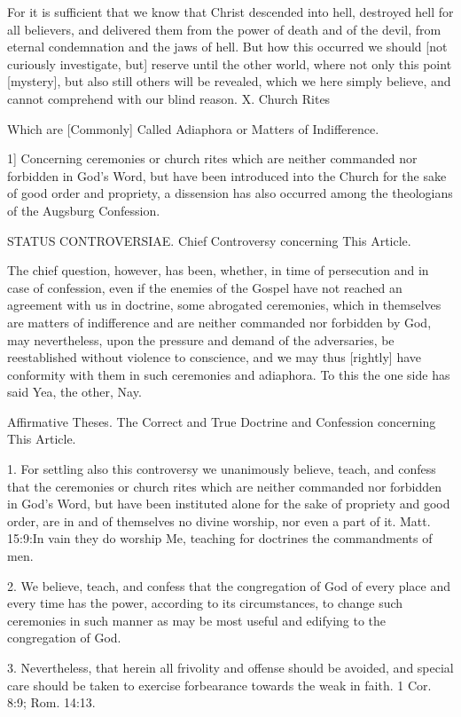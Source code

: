 For it is sufficient that we know that Christ descended into hell, destroyed hell for all believers, and delivered them from the power of death and of the devil, from eternal condemnation and the jaws of hell. But how this occurred we should [not curiously investigate, but] reserve until the other world, where not only this point [mystery], but also still others will be revealed, which we here simply believe, and cannot comprehend with our blind reason.
X. Church Rites

Which are [Commonly] Called Adiaphora or Matters of Indifference.

1] Concerning ceremonies or church rites which are neither commanded nor forbidden in God's Word, but have been introduced into the Church for the sake of good order and propriety, a dissension has also occurred among the theologians of the Augsburg Confession.

STATUS CONTROVERSIAE.
Chief Controversy concerning This Article.

The chief question, however, has been, whether, in time of persecution and in case of confession, even if the enemies of the Gospel have not reached an agreement with us in doctrine, some abrogated ceremonies, which in themselves are matters of indifference and are neither commanded nor forbidden by God, may nevertheless, upon the pressure and demand of the adversaries, be reestablished without violence to conscience, and we may thus [rightly] have conformity with them in such ceremonies and adiaphora. To this the one side has said Yea, the other, Nay.

Affirmative Theses.
The Correct and True Doctrine and Confession concerning This Article.

1. For settling also this controversy we unanimously believe, teach, and confess that the ceremonies or church rites which are neither commanded nor forbidden in God's Word, but have been instituted alone for the sake of propriety and good order, are in and of themselves no divine worship, nor even a part of it. Matt. 15:9:In vain they do worship Me, teaching for doctrines the commandments of men.

2. We believe, teach, and confess that the congregation of God of every place and every time has the power, according to its circumstances, to change such ceremonies in such manner as may be most useful and edifying to the congregation of God.

3. Nevertheless, that herein all frivolity and offense should be avoided, and special care should be taken to exercise forbearance towards the weak in faith. 1 Cor. 8:9; Rom. 14:13.

